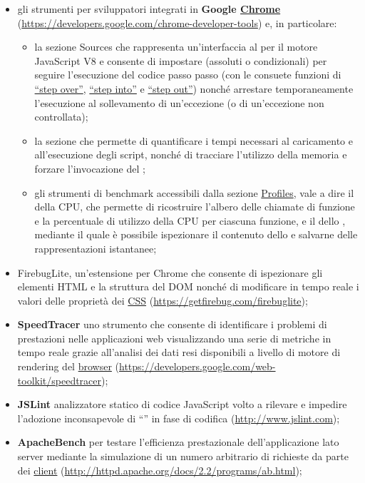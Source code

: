 {\begin{itemize}
\begin{itemize}
 \end{itemize}
 \item gli strumenti per sviluppatori integrati in \textbf{Google \underline{Chrome}} (\url{https://developers.google.com/chrome-developer-tools}) e, in particolare:
   \begin{itemize}
   \item la sezione Sources che rappresenta un'interfaccia al \underline{} per il motore JavaScript V8 e consente di impostare \underline{} (assoluti o condizionali) per seguire l'esecuzione del codice passo passo (con le consuete funzioni di \underline{``step over''}, \underline{``step into''} e \underline{``step out''}) nonché arrestare temporaneamente l'esecuzione al sollevamento di un'eccezione (o di un'eccezione non controllata);
   \item la sezione  che permette di quantificare i tempi necessari al caricamento e all'esecuzione degli script, nonché di tracciare l'utilizzo della memoria e forzare l'invocazione del ;
   \item  gli strumenti di benchmark accessibili dalla sezione \underline{Profiles}, vale a dire il  della CPU, che permette di ricostruire l'albero delle chiamate di funzione e la percentuale di utilizzo della CPU per ciascuna funzione, e il  dello , mediante il quale è possibile ispezionare il contenuto dello  e salvarne delle rappresentazioni istantanee;
   \end{itemize}
  \item FirebugLite, un'estensione per Chrome che consente di ispezionare gli elementi HTML e la struttura del DOM nonché di modificare in tempo reale i valori delle proprietà dei \underline{CSS} (\url{https://getfirebug.com/firebuglite});
  \item \textbf{SpeedTracer} uno strumento che consente di identificare i problemi di prestazioni nelle applicazioni web visualizzando una serie di metriche in tempo reale grazie all'analisi dei dati resi disponibili a livello di motore di rendering del \underline{browser} (\url{https://developers.google.com/web-toolkit/speedtracer});
  \item \textbf{JSLint} analizzatore statico di codice JavaScript volto a rilevare e impedire l'adozione inconsapevole di ``\underline{}'' in fase di codifica (\url{http://www.jslint.com});
  \item \textbf{ApacheBench} per testare l'efficienza prestazionale dell'applicazione lato server mediante la simulazione di un numero arbitrario di richieste da parte dei \underline{client} (\url{http://httpd.apache.org/docs/2.2/programs/ab.html});

\end{itemize}}
